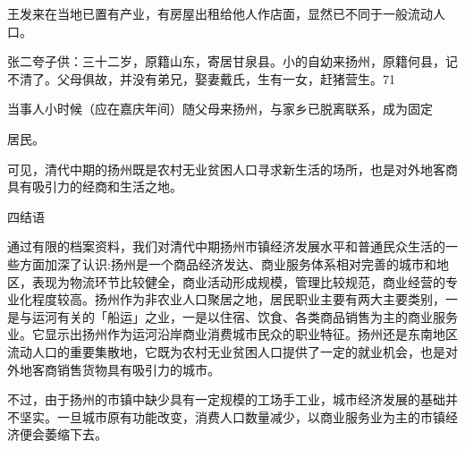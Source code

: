 王发来在当地已置有产业，有房屋出租给他人作店面，显然已不同于一般流动人口。

张二夸子供：三十二岁，原籍山东，寄居甘泉县。小的自幼来扬州，原籍何县，记不清了。父母俱故，并没有弟兄，娶妻戴氏，生有一女，赶猪营生。71

当事人小时候（应在嘉庆年间）随父母来扬州，与家乡已脱离联系，成为固定

\vfill
\begin{BookNotes}
\end{BookNotes}

\noindent 居民。

可见，清代中期的扬州既是农村无业贫困人口寻求新生活的场所，也是对外地客商具有吸引力的经商和生活之地。

四结语

通过有限的档案资料，我们对清代中期扬州市镇经济发展水平和普通民众生活的一些方面加深了认识:扬州是一个商品经济发达、商业服务体系相对完善的城市和地区，表现为物流环节比较健全，商业活动形成规模，管理比较规范，商业经营的专业化程度较高。扬州作为非农业人口聚居之地，居民职业主要有两大主要类别，一是与运河有关的「船运」之业，一是以住宿、饮食、各类商品销售为主的商业服务业。它显示出扬州作为运河沿岸商业消费城市民众的职业特征。扬州还是东南地区流动人口的重要集散地，它既为农村无业贫困人口提供了一定的就业机会，也是对外地客商销售货物具有吸引力的城市。

不过，由于扬州的市镇中缺少具有一定规模的工场手工业，城市经济发展的基础并不坚实。一旦城市原有功能改变，消费人口数量减少，以商业服务业为主的市镇经济便会萎缩下去。


